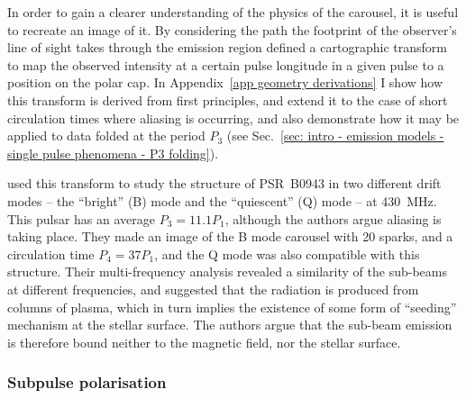 In order to gain a clearer understanding of the physics of the carousel, it is useful to recreate an image of it. By considering the path the footprint of the observer's line of sight takes through the emission region \citet{DRxx1999} defined a cartographic transform to map the observed intensity at a certain pulse longitude in a given pulse to a position on the polar cap. In Appendix~\ref{app geometry derivations} I show how this transform is derived from first principles, and extend it to the case of short circulation times where aliasing is occurring, and also demonstrate how it may be applied to data folded at the period $P_3$ (see Sec.~\ref{sec: intro - emission models - single pulse phenomena - P3 folding}). 

\citet{DRxx2001} used this transform to study the structure of PSR~B0943 in two different drift modes -- the ``bright'' (B) mode and the ``quiescent'' (Q) mode -- at 430~MHz. This pulsar has an average $P_3 = 11.1 P_1$, although the authors argue aliasing is taking place. They made an image of the B mode carousel with 20 sparks, and a circulation time $P_4 = 37 P_1$, and the Q mode was also compatible with this structure. Their multi-frequency analysis revealed a similarity of the sub-beams at different frequencies, and suggested that the radiation is produced from columns of plasma, which in turn implies the existence of some form of ``seeding'' mechanism at the stellar surface. The authors argue that the sub-beam emission is therefore bound neither to the magnetic field, nor the stellar surface.

\subsubsection*{Subpulse polarisation}
\label{sec: intro - emission models - single pulse phenomena - subpulse polarisation}

